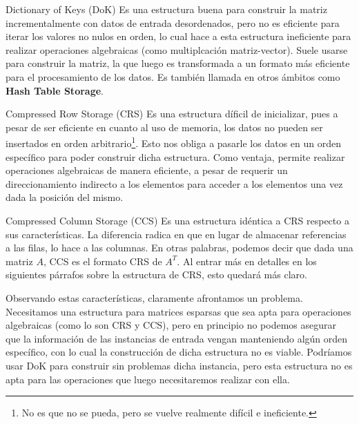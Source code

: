 \smallskip
\begin{LaTeXdescription}
    \item[Dictionary of Keys (DoK)] Es una estructura buena para construir la
        matriz incrementalmente con datos de entrada desordenados, pero no es
        eficiente para iterar los valores no nulos en orden, lo cual hace a
        esta estructura ineficiente para realizar operaciones algebraicas (como
        multiplcaci\'on matriz-vector). Suele usarse para
        construir la matriz, la que luego es transformada a un formato m\'as
        eficiente para el procesamiento de los datos\cite{wiki_dok}. Es
        tambi\'en llamada en otros \'ambitos como \textbf{Hash Table
        Storage}\cite{alglib_sparse}.

    \item[Compressed Row Storage (CRS)] Es una estructura d\'ificil de
        inicializar, pues a pesar de ser eficiente en cuanto al uso de memoria,
        los datos no pueden ser insertados en orden arbitrario\footnote{No es
        que no se pueda, pero se vuelve realmente difícil e ineficiente.}. Esto nos obliga a
        pasarle los datos en un orden espec\'ifico para poder construir dicha
        estructura. Como ventaja, permite realizar operaciones
        algebraicas de manera eficiente, a pesar de requerir un direccionamiento
        indirecto a los elementos para acceder a los elementos una vez dada la
        posici\'on del mismo\cite{wiki_dok}\cite{alglib_sparse}.

    \item[Compressed Column Storage (CCS)] Es una estructura id\'entica a CRS
        respecto a sus caracter\'isticas. La diferencia radica en que en lugar
        de almacenar referencias a las filas, lo hace a las columnas. En otras
        palabras, podemos decir que dada una matriz $A$, CCS es el formato CRS de
        $A^T$\cite{netlib_ccs}. Al entrar m\'as en detalles en los siguientes
        p\'arrafos sobre la estructura de CRS, esto quedar\'a m\'as claro.
\end{LaTeXdescription}
\medskip

\par Observando estas caracter\'isticas, claramente afrontamos un problema.
Necesitamos una estructura para matrices esparsas que sea apta para operaciones
algebraicas (como lo son CRS y CCS), pero en principio no podemos asegurar que
la informaci\'on de las instancias de entrada vengan manteniendo alg\'un orden
espec\'ifico, con lo cual la construcci\'on de dicha estructura no es viable.
Podr\'iamos usar DoK para construir sin problemas dicha instancia, pero esta
estructura no es apta para las operaciones que luego necesitaremos realizar con
ella.

